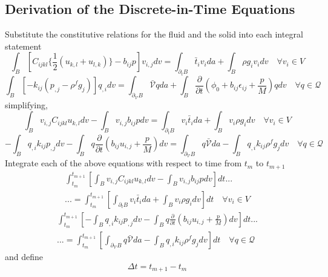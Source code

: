\documentclass[11pt]{article} %
\begin{document}
\subsection{Derivation of the Discrete-in-Time Equations}
Substitute the constitutive relations for the fluid and the solid into each integral statement
\begin{equation}
	\int_B \left[ C_{ijkl} \{ \frac{1}{2} (u_{k,l}+u_{l,k}) \} - b_{ij} p \right] v_{i,j} dv = \int_{\partial_t B} \bar{t}_i v_i da + \int_B \rho g_i v_i dv \quad \forall v_i \in V
\end{equation}
\begin{equation}
	\int_B \left[ -k_{ij} ( p_{,j} - \rho^f g_j ) \right] q_{,i} dv = \int_{\partial_{\mathcal{V}} B} \bar{\mathcal{V}} q da + \int_B \frac{\partial}{\partial t} ( \phi_0 + b_{ij} \epsilon_{ij} + \frac{p}{M} ) q dv \quad \forall q \in \mathcal{Q}
\end{equation}
simplifying,
\begin{equation}
	\int_B v_{i,j} C_{ijkl} u_{k,l} dv - \int_B v_{i,j} b_{ij} p dv = \int_{\partial_t B} v_i \bar{t}_i da + \int_B v_i \rho g_i dv \quad \forall v_i \in V
\end{equation}
\begin{equation}
	- \int_B q_{,i} k_{ij} p_{,j} dv - \int_B q \frac{\partial}{\partial t} ( b_{ij} u_{i,j} + \frac{p}{M} ) dv= \int_{\partial_{\mathcal{V}} B} q \bar{\mathcal{V}} da - \int_B q_{,i} k_{ij} \rho^f g_j dv \quad \forall q \in \mathcal{Q}
\end{equation}
Integrate each of the above equations with respect to time from $t_m$ to $t_{m+1}$
\begin{eqnarray}
	\int_{t_m}^{t_{m+1}} \left[ \int_B v_{i,j} C_{ijkl} u_{k,l} dv - \int_B v_{i,j} b_{ij} p dv \right] dt ... \nonumber \\
	... = \int_{t_m}^{t_{m+1}} \left[ \int_{\partial_t B} v_i \bar{t}_i da + \int_B v_i \rho g_i dv \right] dt \quad \forall v_i \in V
\end{eqnarray}
\begin{eqnarray}
	\int_{t_m}^{t_{m+1}} \left[ - \int_B q_{,i} k_{ij} p_{,j} dv - \int_B q \frac{\partial}{\partial t} ( b_{ij} u_{i,j} + \frac{p}{M} ) dv \right] dt ... \nonumber \\
	... = \int_{t_m}^{t_{m+1}} \left[ \int_{\partial_{\mathcal{V}} B} q \bar{\mathcal{V}} da - \int_B q_{,i} k_{ij} \rho^f g_j dv \right] dt \quad \forall q \in \mathcal{Q} 
\end{eqnarray}
and define
\begin{equation}
	\Delta t = t_{m+1} - t_m
\end{equation}
\end{document}
